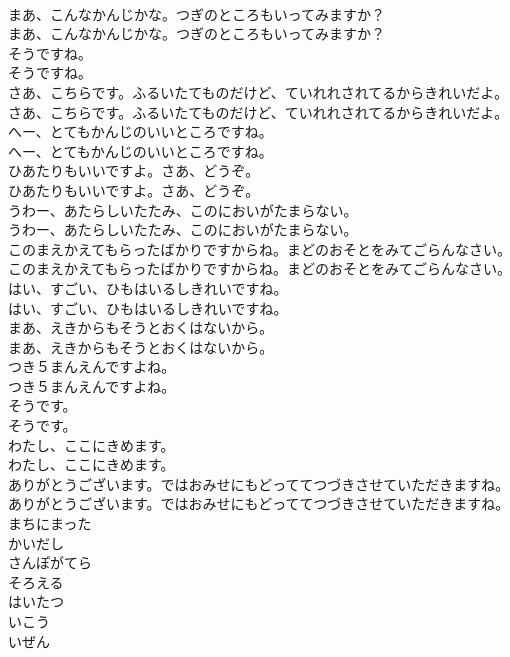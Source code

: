 \documentclass[8pt]{extreport}
\begin{document}
\begin{CJK}{UTF8}{min}
\\	まあ、こんなかんじかな。つぎのところもいってみますか？	
\\	まあ、こんなかんじかな。つぎのところもいってみますか？ 
\\	そうですね。	
\\	そうですね。 
\\	さあ、こちらです。ふるいたてものだけど、ていれれされてるからきれいだよ。	
\\	さあ、こちらです。ふるいたてものだけど、ていれれされてるからきれいだよ。 
\\	へー、とてもかんじのいいところですね。	
\\	へー、とてもかんじのいいところですね。 
\\	ひあたりもいいですよ。さあ、どうぞ。	
\\	ひあたりもいいですよ。さあ、どうぞ。 
\\	うわー、あたらしいたたみ、このにおいがたまらない。	
\\	うわー、あたらしいたたみ、このにおいがたまらない。 
\\	このまえかえてもらったばかりですからね。まどのおそとをみてごらんなさい。	
\\	このまえかえてもらったばかりですからね。まどのおそとをみてごらんなさい。 
\\	はい、すごい、ひもはいるしきれいですね。	
\\	はい、すごい、ひもはいるしきれいですね。 
\\	まあ、えきからもそうとおくはないから。	
\\	まあ、えきからもそうとおくはないから。 
\\	つき５まんえんですよね。	
\\	つき５まんえんですよね。 
\\	そうです。	
\\	そうです。 
\\	わたし、ここにきめます。	
\\	わたし、ここにきめます。 
\\	ありがとうございます。ではおみせにもどっててつづきさせていただきますね。	
\\	ありがとうございます。ではおみせにもどっててつづきさせていただきますね。 
\\	まちにまった
\\	かいだし
\\	さんぽがてら
\\	そろえる
\\	はいたつ
\\	いこう
\\	いぜん

\end{CJK}
\end{document}
